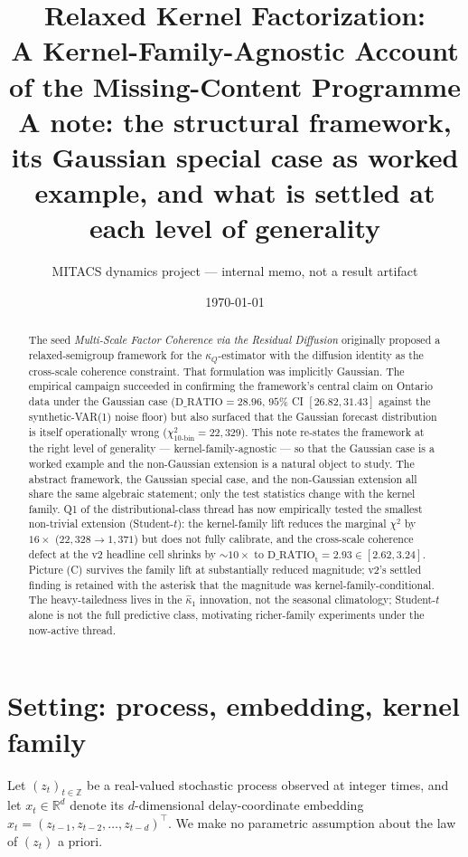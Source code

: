 \documentclass[11pt]{article}
\title{\textbf{Relaxed Kernel Factorization:\\
A Kernel-Family-Agnostic Account of the Missing-Content Programme}\\[4pt]
\large A note: the structural framework, its Gaussian special case
as worked example, and what is settled at each level of generality}
\author{MITACS dynamics project --- internal memo, not a result artifact}
\date{\today}
\newcommand{\kQ}{\kappa_{Q}}
\newcommand{\Rb}{\mathbb{R}}
\newcommand{\Zb}{\mathbb{Z}}
\newcommand{\Studt}{\mathrm{t}}
\theoremstyle{definition}
\theoremstyle{plain}
\begin{document}
\maketitle

\begin{abstract}
\noindent
The seed \emph{Multi-Scale Factor Coherence via the Residual
Diffusion} originally proposed a relaxed-semigroup framework
for the $\kQ$-estimator with the diffusion identity as the
cross-scale coherence constraint. That formulation was implicitly
Gaussian. The empirical campaign succeeded in confirming the
framework's central claim on Ontario data under the Gaussian case
($\mathrm{D\_RATIO} = 28.96$, $95\%$ CI $[26.82, 31.43]$ against
the synthetic-VAR(1) noise floor) but also surfaced that the
Gaussian forecast distribution is itself operationally wrong
($\chi^{2}_{10\text{-bin}} = 22{,}329$). This note re-states the
framework at the right level of generality --- kernel-family-agnostic
--- so that the Gaussian case is a worked example and the non-Gaussian
extension is a natural object to study. The abstract framework, the
Gaussian special case, and the non-Gaussian extension all share the
same algebraic statement; only the test statistics change with the
kernel family. Q1 of the distributional-class thread has now
empirically tested the smallest non-trivial extension (Student-$t$):
the kernel-family lift reduces the marginal $\chi^{2}$ by $16\times$
($22{,}328 \to 1{,}371$) but does not fully calibrate, and the
cross-scale coherence defect at the v2 headline cell shrinks by
$\sim 10\times$ to $\mathrm{D\_RATIO}_{\Studt} = 2.93 \in [2.62,
3.24]$. Picture (C) survives the family lift at substantially
reduced magnitude; v2's settled finding is retained with the
asterisk that the magnitude was kernel-family-conditional. The
heavy-tailedness lives in the $\hat\kappa_1$ innovation, not the
seasonal climatology; Student-$t$ alone is not the full predictive
class, motivating richer-family experiments under the now-active
thread.
\end{abstract}

\section{Setting: process, embedding, kernel family}
\label{sec:setting}

Let $(z_t)_{t\in\Zb}$ be a real-valued stochastic process observed
at integer times, and let $x_t \in \Rb^d$ denote its $d$-dimensional
delay-coordinate embedding $x_t = (z_{t-1}, z_{t-2}, \ldots, z_{t-d})^{\top}$.
We make no parametric assumption about the law of $(z_t)$ a priori.
\end{document}
